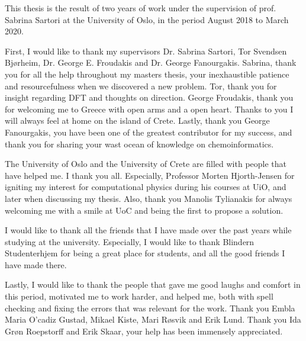 
This thesis is the result of two years of work under the supervision of prof. Sabrina Sartori at the University of Oslo, in the period August 2018 to March 2020. 

First, I would like to thank my supervisors Dr. Sabrina Sartori, Tor Svendsen Bjørheim, Dr. George E. Froudakis and Dr. George Fanourgakis. Sabrina, thank you for all the help throughout my masters thesis, your inexhaustible patience and resourcefulness when we discovered a new problem. Tor, thank you for insight  regarding DFT and thoughts on direction. George Froudakis, thank you for welcoming me to Greece with open arms and a open heart. Thanks to you I will always feel at home on the island of Crete. Lastly, thank you George Fanourgakis, you have been one of the greatest contributor for my success, and thank you for sharing your wast ocean of knowledge on chemoinformatics. 

The University of Oslo and the University of Crete are filled with people that have helped me. I thank you all. Especially, Professor Morten Hjorth-Jensen for igniting my interest for computational physics during his courses at UiO, and later when discussing my thesis. Also, thank you Manolis Tylianakis for always welcoming me with a smile at UoC and being the first to propose a solution.

I would like to thank all the friends that I have made over the past years while studying at the university. Especially, I would like to thank Blindern Studenterhjem for being a great place for students, and all the good friends I have made there. 

Lastly, I would like to thank the people that gave me good laughs and comfort in this period, motivated me to work harder,  and helped me, both with spell checking and fixing the errors that was relevant for the work. Thank you Embla Maria O'cadiz Gustad, Mikael Kiste, Mari Røsvik and Erik Lund. Thank you Ida Grøn Roepstorff and Erik Skaar, your help has been immensely appreciated. 




